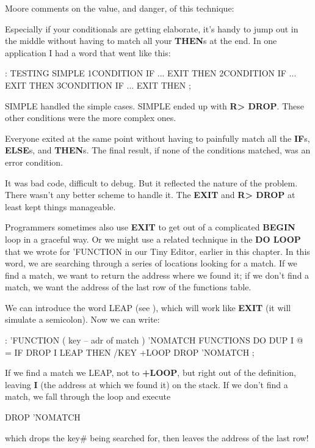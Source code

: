 \bigskip\blackline{2ex}
\noindent Moore comments on the value, and danger, of this technique:
\begin{tfquot}
Especially if your conditionals are getting elaborate, it's handy to jump out
in the middle without having to match all your \textbf{THEN}s at the end. In one
application I had a word that went like this:

\begin{Code}
: TESTING
   SIMPLE  1CONDITION IF ... EXIT THEN
           2CONDITION IF ... EXIT THEN
           3CONDITION IF ... EXIT THEN ;
\end{Code}
SIMPLE handled the simple cases. SIMPLE ended up with \textbf{R> DROP}.
These other conditions were the more complex ones.

Everyone exited at the same point without having to painfully match all
the \textbf{IF}s, \textbf{ELSE}s, and \textbf{THEN}s. The final result, if none of the
conditions matched, was an error condition.

It was bad code, difficult to debug. But it reflected the nature of the
problem. There wasn't any better scheme to handle it. The \textbf{EXIT} and
\textbf{R> DROP} at least kept things manageable.
\end{tfquot}\blackline{1ex}
Programmers sometimes also use \textbf{EXIT} to get out of a complicated
\textbf{BEGIN} loop in a graceful way. Or we might use a related technique in the
\textbf{DO LOOP} that we wrote for 'FUNCTION in our Tiny Editor, earlier in
this chapter. In this word, we are searching through a series of locations
looking for a match. If we find a match, we want to return the address
where we found it; if we don't find a match, we want the address of the
last row of the functions table.

We can introduce the word LEAP (see ), which will work
like \textbf{EXIT} (it will simulate a semicolon). Now we can write:

\begin{Code}
: 'FUNCTION  ( key -- adr of match )
   'NOMATCH FUNCTIONS DO  DUP  I @ =  IF  DROP I LEAP
   THEN  /KEY +LOOP  DROP  'NOMATCH ;
\end{Code}
If we find a match we LEAP, not to \textbf{+LOOP}, but right out of the definition,
leaving \textbf{I} (the address at which we found it) on the stack. If we don't
find a match, we fall through the loop and execute

\begin{Code}
DROP  'NOMATCH
\end{Code}
which drops the key\# being searched for, then leaves the address of the
last row!

